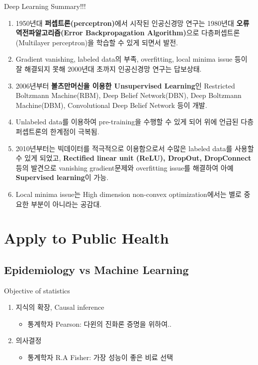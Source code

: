 \documentclass{beamer}
\begin{document}
\begin{frame}{Deep Learning Summary!!!}\footnotesize
\begin{enumerate}
  \item 1950년대 \textbf{퍼셉트론(perceptron)}에서 시작된 인공신경망 연구는 1980년대 \textbf{오류역전파알고리즘(Error Backpropagation Algorithm)}으로 다층퍼셉트론(Multilayer perceptron)을 학습할 수 있게 되면서 발전.
  \item Gradient vanishing, labeled data의 부족, overfitting, local minima issue 등이 잘 해결되지 못해 2000년대 초까지 인공신경망 연구는 답보상태.
  \item 2006년부터 \textbf{볼츠만머신을 이용한 Unsupervised Learning}인 Restricted Boltzmann Machine(RBM), Deep Belief Network(DBN), Deep Boltzmann Machine(DBM), Convolutional Deep Belief Network 등이 개발.
  \item Unlabeled data를 이용하여 pre-training을 수행할 수 있게 되어 위에 언급된 다층퍼셉트론의 한계점이 극복됨.
  \item 2010년부터는 빅데이터를 적극적으로 이용함으로서 수많은 labeled data를 사용할 수 있게 되었고, \textbf{Rectified linear unit (ReLU), DropOut, DropConnect} 등의 발견으로 vanishing gradient문제와 overfitting issue를 해결하여 아예 \textbf{Supervised learning}이 가능.
  \item Local minima issue는 High dimension non-convex optimization에서는 별로 중요한 부분이 아니라는 공감대.
  \end{enumerate}
\end{frame}



\section{\protect\textbf{Apply to Public Health}}

\subsection{Epidemiology vs Machine Learning}

\begin{frame}{Objective of statistics}
\begin{enumerate}
\item 지식의 확장, Causal inference
\begin{itemize}
\item 통계학자 Pearson: 다윈의 진화론 증명을 위하여..
\end{itemize}
\item 의사결정
\begin{itemize}
\item 통계학자 R.A Fisher: 가장 성능이 좋은 비료 선택 
\end{itemize}
\end{enumerate}
\end{frame}
\end{document}
